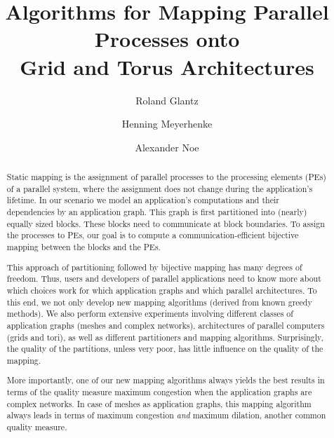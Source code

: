 \documentclass[pdftex]{llncs}
\begin{document}
\title{Algorithms for Mapping Parallel Processes onto\\Grid and Torus Architectures}

\author{Roland Glantz \and Henning Meyerhenke \and Alexander Noe}

\maketitle
\vspace{-4mm}

\begin{abstract}
Static mapping is the assignment of parallel processes to the
processing elements (PEs) of a parallel system, where the assignment
does not change during the application's lifetime. In our scenario we
model an application's computations and their dependencies by an
application graph. This graph is first partitioned into (nearly)
equally sized blocks. These blocks need to communicate at block
boundaries.  To assign the processes to PEs, our goal is to compute a
communication-efficient bijective mapping between the blocks and the
PEs.

This approach of partitioning followed by bijective mapping has many
degrees of freedom. Thus, users and developers of parallel
applications need to know more about which choices work for which
application graphs and which parallel architectures. To this end, we
not only develop new mapping algorithms (derived from known greedy
methods).  We also perform extensive experiments involving different
classes of application graphs (meshes and complex networks),
architectures of parallel computers (grids and tori), as well as
different partitioners and mapping algorithms. Surprisingly, the
quality of the partitions, unless very poor, has little influence on
the quality of the mapping.

More importantly, one of our new mapping algorithms always yields the
best results in terms of the quality measure maximum congestion when
the application graphs are complex networks.  In case of meshes as
application graphs, this mapping algorithm always leads in terms of
maximum congestion \emph{and} maximum dilation, another common quality
measure.
\end{abstract}
\end{document}
